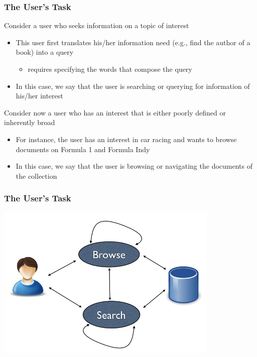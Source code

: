 \documentclass[svgnames]{beamer}
\begin{document}
\begin{frame}
  \frametitle{The User's Task}

\begin{block}{Consider a user who seeks information on a topic of interest}

\begin{itemize}

\item This user first translates his/her information need (e.g., find the author of a book) into a query

\begin{itemize} \item requires specifying the words that compose the
  query 
\end{itemize}

\item In this case, we say that the user is \alert{searching} or \alert{querying} for
information of his/her interest

\end{itemize}
\end{block}

\begin{block} {Consider now a user who has an interest that is either poorly defined or inherently broad}
\begin{itemize}
 \item For instance, the user has an interest in car racing and wants to browse documents on Formula 1 and Formula Indy
\item In this case, we say that the user is \alert{browsing} or \alert{navigating} the documents of the collection
\end{itemize}
\end{block}

\end{frame}

\begin{frame}
\frametitle{The User's Task}

\begin{center}
  \includegraphics[width=0.8\textwidth]{user-interaction.png}
\end{center}

\end{frame}
\end{document}
